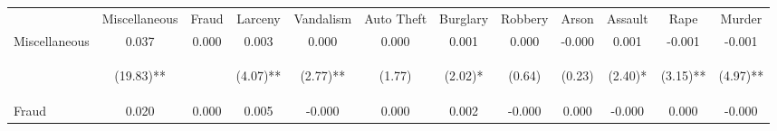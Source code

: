\begin{tabular}{lccccccccccc}
\hline\hline \noalign{\smallskip} & Miscellaneous & Fraud & Larceny & Vandalism & Auto Theft & Burglary & Robbery & Arson & Assault & Rape & Murder\\
\noalign{\smallskip}\hline \noalign{\smallskip}Miscellaneous & 0.037 & 0.000 & 0.003 & 0.000 & 0.000 & 0.001 & 0.000 & -0.000 & 0.001 & -0.001 & -0.001\\
 & \begin{footnotesize}(19.83)**\end{footnotesize} & \begin{footnotesize}\end{footnotesize} & \begin{footnotesize}(4.07)**\end{footnotesize} & \begin{footnotesize}(2.77)**\end{footnotesize} & \begin{footnotesize}(1.77)\end{footnotesize} & \begin{footnotesize}(2.02)*\end{footnotesize} & \begin{footnotesize}(0.64)\end{footnotesize} & \begin{footnotesize}(0.23)\end{footnotesize} & \begin{footnotesize}(2.40)*\end{footnotesize} & \begin{footnotesize}(3.15)**\end{footnotesize} & \begin{footnotesize}(4.97)**\end{footnotesize}\\
\noalign{\smallskip}Fraud & 0.020 & 0.000 & 0.005 & -0.000 & 0.000 & 0.002 & -0.000 & 0.000 & -0.000 & 0.000 & -0.000\\

\end{tabular}
